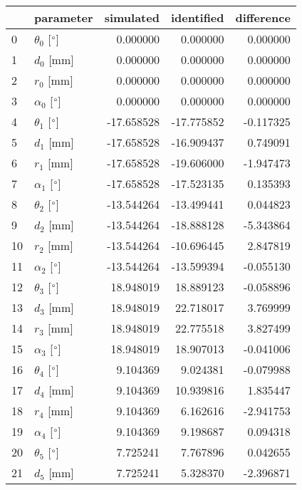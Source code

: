 \documentclass{standalone}%
\begin{document}
%
\normalsize%
\begin{tabular}{llrrr}
\toprule
{} &                 parameter &  simulated & identified & difference \\
\midrule
0  &  $\theta_{0}$ [$\degree$] &   0.000000 &   0.000000 &   0.000000 \\
1  &              $d_{0}$ [mm] &   0.000000 &   0.000000 &   0.000000 \\
2  &              $r_{0}$ [mm] &   0.000000 &   0.000000 &   0.000000 \\
3  &  $\alpha_{0}$ [$\degree$] &   0.000000 &   0.000000 &   0.000000 \\
4  &  $\theta_{1}$ [$\degree$] & -17.658528 & -17.775852 &  -0.117325 \\
5  &              $d_{1}$ [mm] & -17.658528 & -16.909437 &   0.749091 \\
6  &              $r_{1}$ [mm] & -17.658528 & -19.606000 &  -1.947473 \\
7  &  $\alpha_{1}$ [$\degree$] & -17.658528 & -17.523135 &   0.135393 \\
8  &  $\theta_{2}$ [$\degree$] & -13.544264 & -13.499441 &   0.044823 \\
9  &              $d_{2}$ [mm] & -13.544264 & -18.888128 &  -5.343864 \\
10 &              $r_{2}$ [mm] & -13.544264 & -10.696445 &   2.847819 \\
11 &  $\alpha_{2}$ [$\degree$] & -13.544264 & -13.599394 &  -0.055130 \\
12 &  $\theta_{3}$ [$\degree$] &  18.948019 &  18.889123 &  -0.058896 \\
13 &              $d_{3}$ [mm] &  18.948019 &  22.718017 &   3.769999 \\
14 &              $r_{3}$ [mm] &  18.948019 &  22.775518 &   3.827499 \\
15 &  $\alpha_{3}$ [$\degree$] &  18.948019 &  18.907013 &  -0.041006 \\
16 &  $\theta_{4}$ [$\degree$] &   9.104369 &   9.024381 &  -0.079988 \\
17 &              $d_{4}$ [mm] &   9.104369 &  10.939816 &   1.835447 \\
18 &              $r_{4}$ [mm] &   9.104369 &   6.162616 &  -2.941753 \\
19 &  $\alpha_{4}$ [$\degree$] &   9.104369 &   9.198687 &   0.094318 \\
20 &  $\theta_{5}$ [$\degree$] &   7.725241 &   7.767896 &   0.042655 \\
21 &              $d_{5}$ [mm] &   7.725241 &   5.328370 &  -2.396871 \\

\end{tabular}
\end{document}
